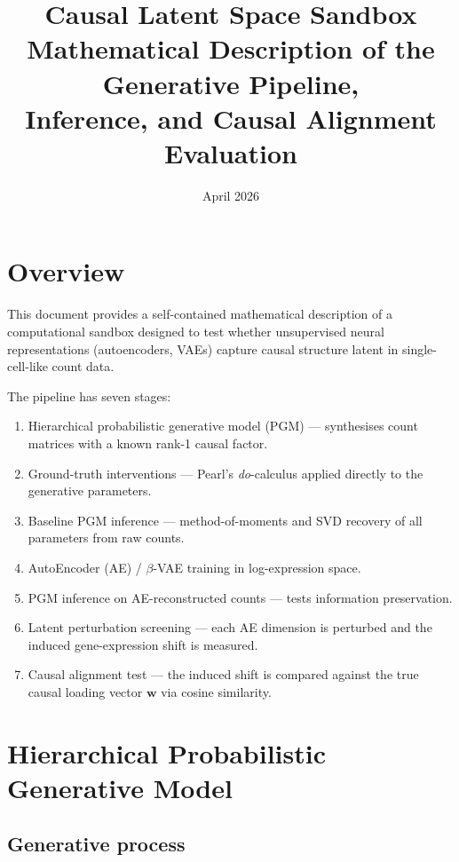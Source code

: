 \documentclass[11pt,a4paper]{article}
\title{\textbf{Causal Latent Space Sandbox}\\
\large Mathematical Description of the Generative Pipeline,\\
Inference, and Causal Alignment Evaluation}
\author{}
\date{April 2026}
\theoremstyle{definition}
\begin{document}
\maketitle
\tableofcontents
\newpage

\section{Overview}

This document provides a self-contained mathematical description of a
computational sandbox designed to test whether unsupervised neural
representations (autoencoders, VAEs) capture causal structure latent in
single-cell-like count data.

The pipeline has seven stages:
\begin{enumerate}
  \item Hierarchical probabilistic generative model (PGM) --- synthesises
        count matrices with a known rank-1 causal factor.
  \item Ground-truth interventions --- Pearl's \emph{do}-calculus applied
        directly to the generative parameters.
  \item Baseline PGM inference --- method-of-moments and SVD recovery of
        all parameters from raw counts.
  \item AutoEncoder (AE) / $\beta$-VAE training in log-expression space.
  \item PGM inference on AE-reconstructed counts --- tests information
        preservation.
  \item Latent perturbation screening --- each AE dimension is perturbed
        and the induced gene-expression shift is measured.
  \item Causal alignment test --- the induced shift is compared against the
        true causal loading vector $\bm{w}$ via cosine similarity.
\end{enumerate}

\section{Hierarchical Probabilistic Generative Model}
\label{sec:pgm}

\subsection{Generative process}
\end{document}
